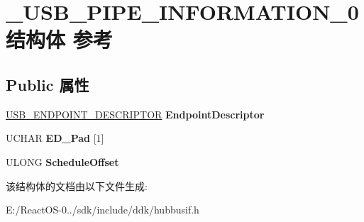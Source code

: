 \hypertarget{struct___u_s_b___p_i_p_e___i_n_f_o_r_m_a_t_i_o_n__0}{}\section{\+\_\+\+U\+S\+B\+\_\+\+P\+I\+P\+E\+\_\+\+I\+N\+F\+O\+R\+M\+A\+T\+I\+O\+N\+\_\+0结构体 参考}
\label{struct___u_s_b___p_i_p_e___i_n_f_o_r_m_a_t_i_o_n__0}
\subsection*{Public 属性}
\begin{DoxyCompactItemize}
\item 
\mbox{\label{struct___u_s_b___p_i_p_e___i_n_f_o_r_m_a_t_i_o_n__0_a538fd5dc857beb94697c097ca244e371}} 
\hyperlink{struct___u_s_b___e_n_d_p_o_i_n_t___d_e_s_c_r_i_p_t_o_r}{U\+S\+B\+\_\+\+E\+N\+D\+P\+O\+I\+N\+T\+\_\+\+D\+E\+S\+C\+R\+I\+P\+T\+OR} {\bfseries Endpoint\+Descriptor}
\item 
\mbox{\label{struct___u_s_b___p_i_p_e___i_n_f_o_r_m_a_t_i_o_n__0_a84e6ada9ae02f95a0b8fbf714cab5a1a}} 
U\+C\+H\+AR {\bfseries E\+D\+\_\+\+Pad} \mbox{[}1\mbox{]}
\item 
\mbox{\label{struct___u_s_b___p_i_p_e___i_n_f_o_r_m_a_t_i_o_n__0_a8f157661a61a2d03beca49e07bcbd3ac}} 
U\+L\+O\+NG {\bfseries Schedule\+Offset}
\end{DoxyCompactItemize}


该结构体的文档由以下文件生成\+:\begin{DoxyCompactItemize}
\item 
E\+:/\+React\+O\+S-\/0../sdk/include/ddk/hubbusif.\+h\end{DoxyCompactItemize}
